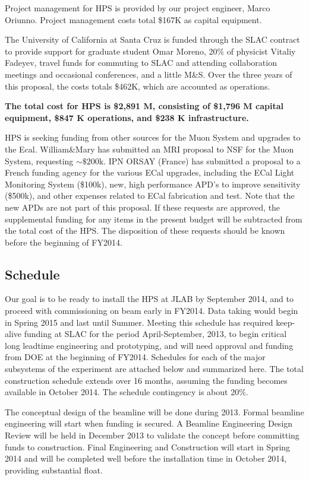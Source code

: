 Project management for HPS is provided by our project engineer, Marco Oriunno. Project management costs total \$167K as capital equipment.

The University of California at Santa Cruz is funded through the SLAC contract to provide support for graduate student Omar Moreno, 20\% of physicist
Vitaliy Fadeyev, travel funds for commuting to SLAC and attending collaboration meetings and occasional conferences, and a little M\&S. Over the three
years of this proposal, the costs totals \$462K, which are accounted as operations.


{\bf The total cost for HPS is \$2,891 M, consisting of \$1,796 M capital equipment, \$847 K operations, and \$238 K infrastructure. }

HPS is seeking funding from other sources for the Muon System and upgrades to the Ecal.
William\&Mary has submitted an MRI proposal to NSF for the Muon System, requesting $\sim \$200$k. IPN ORSAY (France) 
has submitted a proposal to a French funding agency for the various ECal upgrades, including the ECal Light Monitoring System (\$100k), new, 
high performance  APD's to improve sensitivity (\$500k), and other expenses related to ECal fabrication and test.
Note that the new APDs are not part of this proposal. If these requests are approved, the supplemental funding for any items in the present 
budget will be subtracted from the total cost of the HPS. The disposition of these requests should be known before the beginning of FY2014.

\subsection{Schedule}
Our goal is to be ready to install the HPS at JLAB  by September 2014, and to proceed with commissioning on beam early in FY2014. Data taking 
would begin in Spring 2015 and last until Summer. Meeting this schedule has required keep-alive funding at SLAC for the period April-September, 2013, 
to begin critical long leadtime engineering and prototyping, and will need  approval and funding from DOE at the beginning of FY2014. Schedules 
for each of the major subsystems of the experiment are attached below and summarized here. The total construction schedule extends over 16 months, 
assuming the funding becomes available in October 2014. The schedule contingency is about 20\%.
 
The conceptual design of the beamline will be done during 2013. Formal beamline engineering will start when funding is secured. A Beamline Engineering 
Design Review will be held in December 2013 to validate the concept before committing funds to construction. 
Final Engineering and Construction will start in Spring 2014 and will be completed well before the installation time in October 2014, providing substantial float. 

